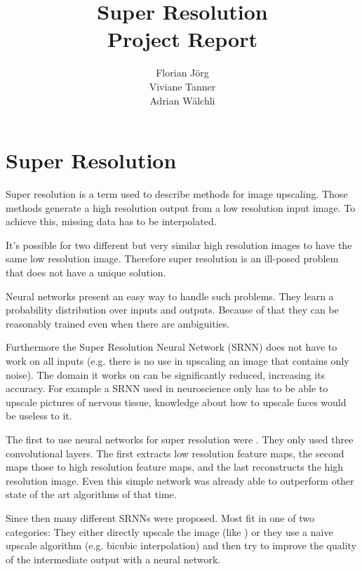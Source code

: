 \documentclass[11pt]{article}
\begin{document}
\author{Florian J\"org\\Viviane Tanner\\Adrian W\"alchli}

\title{\textbf{Super Resolution \\ Project Report}}
\maketitle



\section{Super Resolution}

Super resolution is a term used to describe methods for image upscaling. Those methods generate a high resolution output from a low resolution input image. To achieve this, missing data has to be interpolated.

It's possible for two different but very similar high resolution images to have the same low resolution image. Therefore super resolution is an ill-posed problem that does not have a unique solution.

Neural networks present an easy way to handle such problems. They learn a probability distribution over inputs and outputs. Because of that they can be reasonably trained even when there are ambiguities.

Furthermore the Super Resolution Neural Network (SRNN) does not have to work on all inputs (e.g. there is no use in upscaling an image that contains only noise). The domain it works on can be significantly reduced, increasing its accuracy. For example a SRNN used in neuroscience only has to be able to upscale pictures of nervous tissue, knowledge about how to upscale faces would be useless to it.

The first to use neural networks for super resolution were \citet{dong2016image}. They only used three convolutional layers. The first extracts low resolution feature maps, the second maps those to high resolution feature maps, and the last reconstructs the high resolution image.
Even this simple network was already able to outperform other state of the art algorithms of that time.

Since then many different SRNNs were proposed. Most fit in one of two categories: They either directly upscale the image (like \citet{dong2016image}) or they use a naive upscale algorithm (e.g. bicubic interpolation) and then try to improve the quality of the intermediate output with a neural network.
\end{document}
